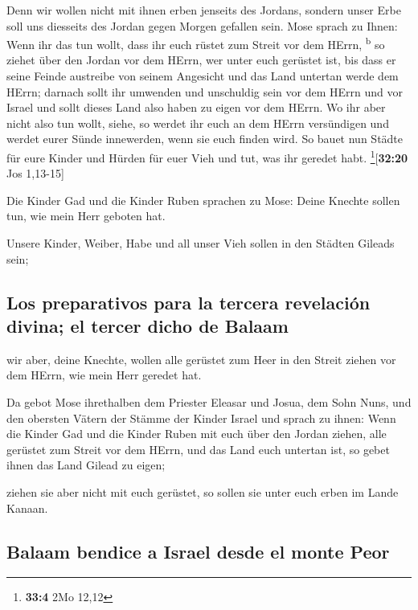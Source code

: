  Denn wir wollen nicht mit ihnen erben jenseits des
Jordans, sondern unser Erbe soll uns diesseits des Jordan gegen Morgen
gefallen sein.  Mose sprach zu Ihnen: Wenn ihr das tun
wollt, dass ihr euch rüstet zum Streit vor dem HErrn,
\textsuperscript{b}  so ziehet über den Jordan vor dem
HErrn, wer unter euch gerüstet ist, bis dass er seine Feinde austreibe
von seinem Angesicht  und das Land untertan werde dem
HErrn; darnach sollt ihr umwenden und unschuldig sein vor dem HErrn und
vor Israel und sollt dieses Land also haben zu eigen vor dem HErrn.
 Wo ihr aber nicht also tun wollt, siehe, so werdet ihr
euch an dem HErrn versündigen und werdet eurer Sünde innewerden, wenn
sie euch finden wird.  So bauet nun Städte für eure
Kinder und Hürden für euer Vieh und tut, was ihr geredet habt.
\footnote{\textbf{33:4} 2Mo 12,12}{[}\textbf{32:20} Jos 1,13-15{]}

 Die Kinder Gad und die Kinder Ruben sprachen zu Mose:
Deine Knechte sollen tun, wie mein Herr geboten hat.

 Unsere Kinder, Weiber, Habe und all unser Vieh sollen in
den Städten Gileads sein;

\hypertarget{los-preparativos-para-la-tercera-revelaciuxf3n-divina-el-tercer-dicho-de-balaam}{%
\subsection{Los preparativos para la tercera revelación divina; el
tercer dicho de
Balaam}\label{los-preparativos-para-la-tercera-revelaciuxf3n-divina-el-tercer-dicho-de-balaam}}

 wir aber, deine Knechte, wollen alle gerüstet zum Heer
in den Streit ziehen vor dem HErrn, wie mein Herr geredet hat.

 Da gebot Mose ihrethalben dem Priester Eleasar und
Josua, dem Sohn Nuns, und den obersten Vätern der Stämme der Kinder
Israel  und sprach zu ihnen: Wenn die Kinder Gad und die
Kinder Ruben mit euch über den Jordan ziehen, alle gerüstet zum Streit
vor dem HErrn, und das Land euch untertan ist, so gebet ihnen das Land
Gilead zu eigen;

 ziehen sie aber nicht mit euch gerüstet, so sollen sie
unter euch erben im Lande Kanaan.

\hypertarget{balaam-bendice-a-israel-desde-el-monte-peor}{%
\subsection{Balaam bendice a Israel desde el monte
Peor}\label{balaam-bendice-a-israel-desde-el-monte-peor}}

